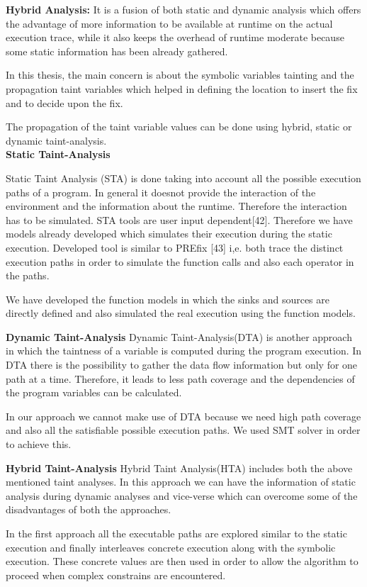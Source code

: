 \textbf{Hybrid Analysis:}
It is a fusion of both static and dynamic analysis which offers the advantage
of more information to be available at runtime on the actual execution trace,
while it also keeps the overhead of runtime moderate because some
static information has been already gathered.


In this thesis, the main concern is about the symbolic variables tainting
and the propagation taint variables which helped in defining the location
to insert the fix and to decide upon the fix.

The propagation of the taint variable values can be done using hybrid,
static or dynamic taint-analysis.\\

\textbf{Static Taint-Analysis}

Static Taint Analysis (STA) is done taking into account all the possible execution
paths of a program. In general it doesnot provide the interaction of the environment and the information
about the runtime. Therefore the interaction has to be simulated. STA tools are user input dependent[42]. 
Therefore we have models already developed which simulates their execution
during the static execution. Developed tool is similar to PREfix [43] i,e. both trace the distinct execution paths in order
to simulate the function calls and also each operator in the paths.

We have developed the function models in which the sinks and sources are directly
defined and also simulated the real execution using the function models. 

\textbf{Dynamic Taint-Analysis}
Dynamic Taint-Analysis(DTA) is another approach in which the taintness of a variable
is computed during the program execution. In DTA there is the possibility to 
gather the data flow information but only for one path at a time. Therefore,
it leads to less path coverage and the dependencies of the program
variables can be calculated.


In our approach we cannot make use of DTA because we need
high path coverage and also all the satisfiable possible execution
paths. We used SMT solver in order to achieve this.


\textbf{Hybrid Taint-Analysis}
Hybrid Taint Analysis(HTA) includes both the above mentioned taint analyses.
In this approach we can have the information of static analysis during 
dynamic analyses and vice-verse which can overcome some of the disadvantages
of both the approaches.

In the first approach all the executable paths are explored similar to the static
execution and finally interleaves concrete execution along with the symbolic 
execution. These concrete values are then used in order to allow the algorithm
to proceed when complex constrains are encountered.

